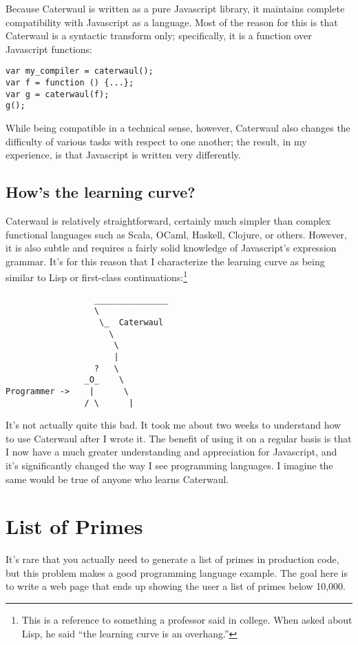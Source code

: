 \documentclass{report}
\begin{document}
  Because Caterwaul is written as a pure Javascript library, it maintains complete compatibility with Javascript as a language. Most of the reason for this is that Caterwaul is a syntactic
  transform only; specifically, it is a function over Javascript functions:

\begin{verbatim}
var my_compiler = caterwaul();
var f = function () {...};
var g = caterwaul(f);
g();
\end{verbatim}

  While being compatible in a technical sense, however, Caterwaul also changes the difficulty of various tasks with respect to one another; the result, in my experience, is that Javascript is
  written very differently.

\section{How's the learning curve?}
    Caterwaul is relatively straightforward, certainly much simpler than complex functional languages such as Scala, OCaml, Haskell, Clojure, or others. However, it is also subtle and requires
    a fairly solid knowledge of Javascript's expression grammar. It's for this reason that I characterize the learning curve as being similar to Lisp or first-class
    continuations:\footnote{This is a reference to something a professor said in college. When asked about Lisp, he said ``the learning curve is an overhang.''}

\begin{verbatim}
                  _______________
                  \
                   \_  Caterwaul
                     \
                      \
                      |
                  ?   \
                _O_    \
Programmer ->    |      \
                / \      |
\end{verbatim}

    It's not actually quite this bad. It took me about two weeks to understand how to use Caterwaul after I wrote it. The benefit of using it on a regular basis is that I now have a much
    greater understanding and appreciation for Javascript, and it's significantly changed the way I see programming languages. I imagine the same would be true of anyone who learns Caterwaul.

\chapter{List of Primes}\label{sec:list-of-primes}
  It's rare that you actually need to generate a list of primes in production code, but this problem makes a good programming language example. The goal here is to write a web page that ends
  up showing the user a list of primes below 10,000.
\end{document}

